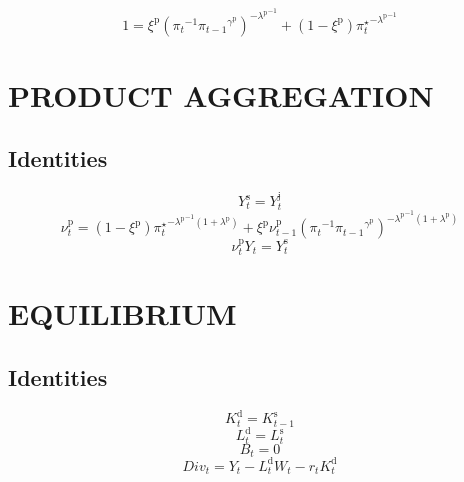 \begin{equation}
1 = {\xi^{\mathrm{p}}} {\left({\pi_{t}}^{-1} {{\pi_{t-1}}^{\gamma^{\mathrm{p}}}}\right)^{-{\lambda^{\mathrm{p}}}^{-1}}} + \left(1 - \xi^{\mathrm{p}}\right) {{\pi^{\star}_{t}}^{-{\lambda^{\mathrm{p}}}^{-1}}}
\end{equation}




\section{PRODUCT AGGREGATION}

\subsection{Identities}

\begin{equation}
Y^{\mathrm{s}}_{t} = Y^{\mathrm{j}}_{t}
\end{equation}
\begin{equation}
\nu^{\mathrm{p}}_{t} = \left(1 - \xi^{\mathrm{p}}\right) {{\pi^{\star}_{t}}^{-{\lambda^{\mathrm{p}}}^{-1} \left(1 + \lambda^{\mathrm{p}}\right)}} + {\xi^{\mathrm{p}}} {\nu^{\mathrm{p}}_{t-1}} {\left({\pi_{t}}^{-1} {{\pi_{t-1}}^{\gamma^{\mathrm{p}}}}\right)^{-{\lambda^{\mathrm{p}}}^{-1} \left(1 + \lambda^{\mathrm{p}}\right)}}
\end{equation}
\begin{equation}
{\nu^{\mathrm{p}}_{t}} {Y_{t}} = Y^{\mathrm{s}}_{t}
\end{equation}




\section{EQUILIBRIUM}

\subsection{Identities}

\begin{equation}
K^{\mathrm{d}}_{t} = K^{\mathrm{s}}_{t-1}
\end{equation}
\begin{equation}
L^{\mathrm{d}}_{t} = L^{\mathrm{s}}_{t}
\end{equation}
\begin{equation}
B_{t} = 0
\end{equation}
\begin{equation}
{D\!i\!v}_{t} = Y_{t} - {L^{\mathrm{d}}_{t}} {W_{t}} - {r_{t}} {K^{\mathrm{d}}_{t}}
\end{equation}




